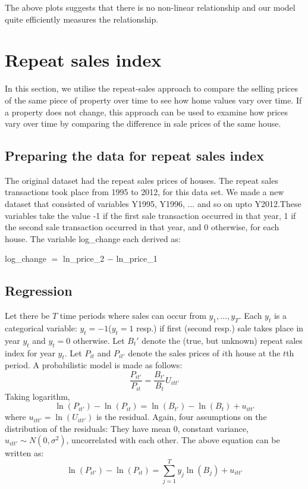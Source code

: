 \documentclass[12pt]{article}
\begin{document}
The above plots suggests that there is no non-linear relationship and our model quite efficiently measures the relationship.

\section{Repeat sales index}
\label{rsi}
In this section, we utilise the repeat-sales approach to compare the selling prices of the same piece of property over time to see how home values vary over time.
If a property does not change, this approach can be used to examine how prices vary over time by comparing the difference in sale prices of the same house.

\subsection{Preparing the data for repeat sales index}
The original dataset had the repeat sales prices of houses. The repeat sales transactions took place from 1995 to 2012, for this data set. We made a new dataset that consisted of variables Y1995, Y1996, ... and so on upto Y2012.These variables take the value -1 if the first sale transaction occurred in that year, 1 if the second sale transaction occurred in that year, and 0 otherwise, for each house. The variable log\_change each derived as:
\begin{center}
    log\_change $=$ ln\_price\_2 $-$ ln\_price\_1
\end{center}
\subsection{Regression}
Let there be $T$ time periods where sales can occur from $y_1, ..., y_T$. Each $y_t$ is a categorical variable: $y_t=-1$($y_t=1$ resp.) if first (second resp.) sale takes place in year $y_t$ and $y_t=0$ otherwise. Let $B_{t}'$ denote the (true, but unknown) repeat sales index for year $y_t$. Let $P_{it}$ and $P_{it'}$ denote the sales prices of $i$th house at the $t$th period. A probabilistic model is made as follows:
$$\frac{P_{it'}}{P_{it}}=\frac{B_{t'}}{B_{t}}U_{itt'}$$
Taking logarithm, 
$$\ln(P_{it'})-\ln(P_{it})=\ln(B_{t'})-\ln(B_{t})+u_{itt'} $$
where $u_{itt'}=\ln(U_{itt'})$ is the residual. Again, four assumptions on the distribution of the residuals: They have mean 0, constant variance, $u_{itt'}\sim N(0, \sigma^2)$, uncorrelated with each other.  The above equation can be written as:
$$\ln(P_{it'})-\ln(P_{it})=\sum_{j=1} ^{T}{y_j \ln(B_{j})} +u_{itt'} $$
\end{document}
